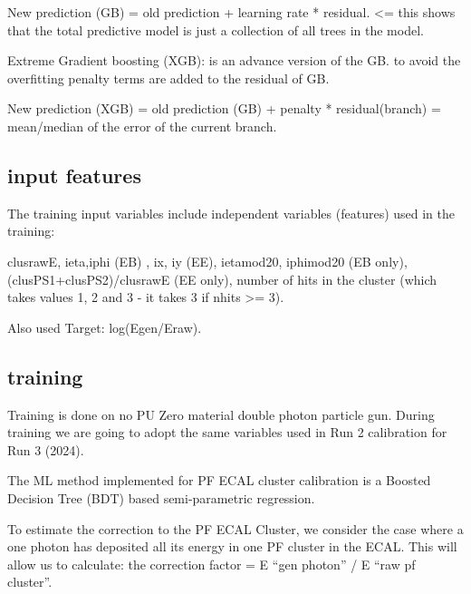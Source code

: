 New prediction (GB)  = old prediction + learning rate * residual. <= this shows that the total predictive model is just a collection of all trees in the model.

Extreme Gradient boosting (XGB): is an advance version of the GB. to avoid the overfitting penalty terms are added to the residual of GB.

New prediction (XGB) = old prediction (GB) + penalty * residual(branch) = mean/median of the error of the current branch.



\subsection{input features}
The training input variables include independent variables (features) used in the training:

clusrawE,
ieta,iphi (EB) ,
ix, iy (EE),
ietamod20, iphimod20 (EB only),
(clusPS1+clusPS2)/clusrawE (EE only),
number of hits in the cluster (which takes values 1, 2 and 3 - it takes 3 if nhits >= 3).

Also  used Target: log(Egen/Eraw).

\subsection{training}
Training is done on no PU Zero material double photon particle gun. During training we are going to adopt the same variables used in Run 2 calibration for Run 3 (2024).

The ML method implemented for PF ECAL cluster calibration is a Boosted Decision Tree (BDT) based semi-parametric regression.

To estimate the correction to  the PF ECAL Cluster, we consider the case where a one photon has deposited all its energy in one PF cluster in the ECAL.
This will allow us to calculate: the correction factor = E “gen photon” / E “raw pf cluster”.

